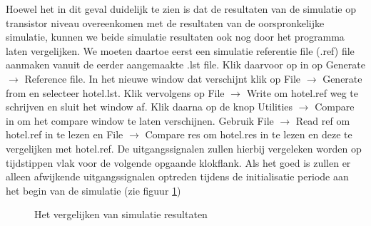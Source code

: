 Hoewel het in dit geval duidelijk te zien is dat de resultaten
van de simulatie op transistor niveau overeenkomen met
de resultaten van de oorspronkelijke  simulatie,
kunnen we beide simulatie resultaten ook nog 
door het programma  laten vergelijken.
We moeten daartoe eerst een simulatie referentie file
(.ref) file aanmaken vanuit de eerder aangemaakte .lst file.
Klik daarvoor op in  op Generate $\rightarrow$ Reference file.
In het nieuwe window dat verschijnt
klik op File $\rightarrow$ Generate from en selecteer hotel.lst.
Klik vervolgens op File $\rightarrow$ Write
om hotel.ref weg te schrijven en sluit het window af.
Klik daarna op de knop Utilities $\rightarrow$ Compare in
 om het compare window
te laten verschijnen.
Gebruik
File $\rightarrow$ Read ref
om hotel.ref in te lezen
en 
File $\rightarrow$ Compare res
om hotel.res in te lezen en
deze te vergelijken met hotel.ref.
De uitgangssignalen zullen hierbij vergeleken worden
op tijdstippen vlak voor de volgende opgaande
klokflank.
Als het goed is zullen er alleen afwijkende
uitgangssignalen optreden tijdens de initialisatie periode 
aan het begin van de simulatie (zie figuur \ref{comparewin})
\begin{figure}[h]
  \centerline{}
  \caption{Het vergelijken van simulatie resultaten}
  \label{comparewin}
\end{figure}
\FloatBarrier
